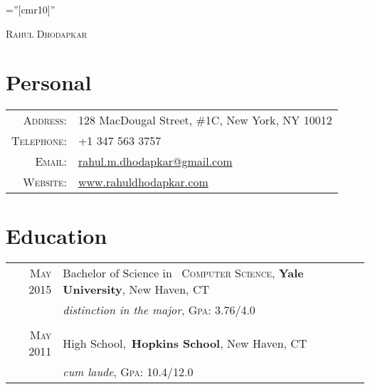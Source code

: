 \documentclass[a4paper,10pt]{article}
\begin{document}

\pagestyle{empty} %

\font\fb=''[cmr10]'' %

\par{\centering
		{\Huge \textsc{Rahul Dhodapkar}
	}\bigskip\par}

\section{Personal}

\begin{tabular}{rl}
    \textsc{Address:}   & 128 MacDougal Street, \#1C, New York, NY 10012 \\
    \textsc{Telephone:}      & +1 347 563 3757\\
    \textsc{Email:}       & \href{mailto:rahul.m.dhodapkar@gmail.com}{rahul.m.dhodapkar@gmail.com}\\
    \textsc{Website:}   & \href{http://www.rahuldhodapkar.com}{www.rahuldhodapkar.com}
\end{tabular}

\section{Education}
\begin{tabular}{rl}	
 \textsc{May} 2015 & Bachelor of Science in \
 \textsc{Computer Science}, \textbf{Yale University}, New Haven, CT\\
&\small\emph{distinction in the major}, \normalsize \textsc{Gpa}: 3.76/4.0\\
\\
\textsc{May} 2011 & High School,\
 \normalsize \textbf{Hopkins School}, New Haven, CT\\
&\small\emph{cum laude}, \normalsize \textsc{Gpa}: 10.4/12.0\\
\end{tabular}
\end{document}
